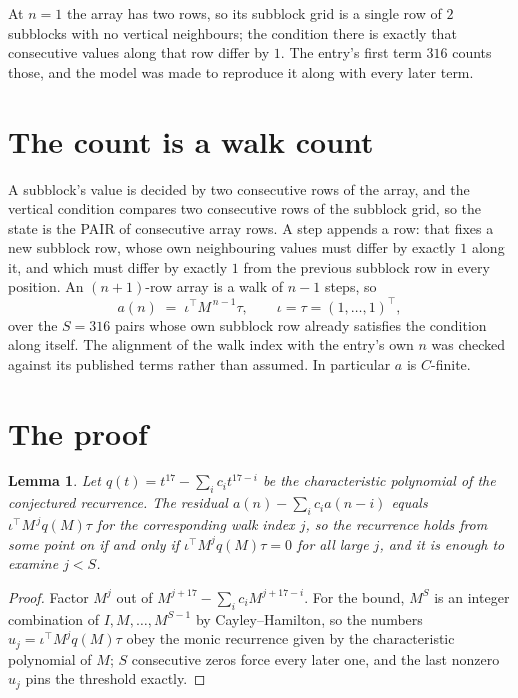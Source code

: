 \documentclass[11pt,a4paper]{article}
\theoremstyle{plain}
\newtheorem{lemma}[theorem]{Lemma}
\theoremstyle{definition}
\begin{document}
At $n=1$ the array has two rows, so its subblock grid is a single row of $2$ subblocks with
no vertical neighbours; the condition there is exactly that consecutive values along that row
differ by $1$. The entry's first term $316$ counts those, and the model was made to
reproduce it along with every later term.

\section{The count is a walk count}

A subblock's value is decided by two consecutive rows of the array, and the
vertical condition compares two consecutive rows of the subblock grid, so the state is the
PAIR of consecutive array rows. A step appends a row: that fixes a new subblock row, whose own
neighbouring values must differ by exactly $1$ along it, and which must differ by exactly
$1$ from the previous subblock row in every position. An $(n+1)$-row array is a walk of
$n-1$ steps, so
\[
a(n)\;=\;\iota^{\!\top}M^{\,n-1}\tau,\qquad\iota=\tau=(1,\dots,1)^{\!\top},
\]
over the $S=316$ pairs whose own subblock row already satisfies the condition along itself.
The alignment of the walk index with the entry's own $n$ was checked against its published
terms rather than assumed. In particular $a$ is $C$-finite.

\section{The proof}

\begin{lemma}\label{lem:crit}
Let $q(t)=t^{17}-\sum_i c_it^{17-i}$ be the characteristic polynomial of the
conjectured recurrence. The residual $a(n)-\sum_ic_ia(n-i)$ equals
$\iota^{\!\top}M^{\,j}q(M)\tau$ for the corresponding walk index $j$, so the recurrence
holds from some point on if and only if $\iota^{\!\top}M^{j}q(M)\tau=0$ for all large $j$,
and it is enough to examine $j<S$.
\end{lemma}

\begin{proof}
Factor $M^{j}$ out of $M^{j+17}-\sum_ic_iM^{j+17-i}$. For the bound, $M^{S}$
is an integer combination of $I,M,\dots,M^{S-1}$ by Cayley--Hamilton, so the numbers
$u_j=\iota^{\!\top}M^{j}q(M)\tau$ obey the monic recurrence given by the characteristic
polynomial of $M$; $S$ consecutive zeros force every later one, and the last nonzero $u_j$
pins the threshold exactly.
\end{proof}
\end{document}
